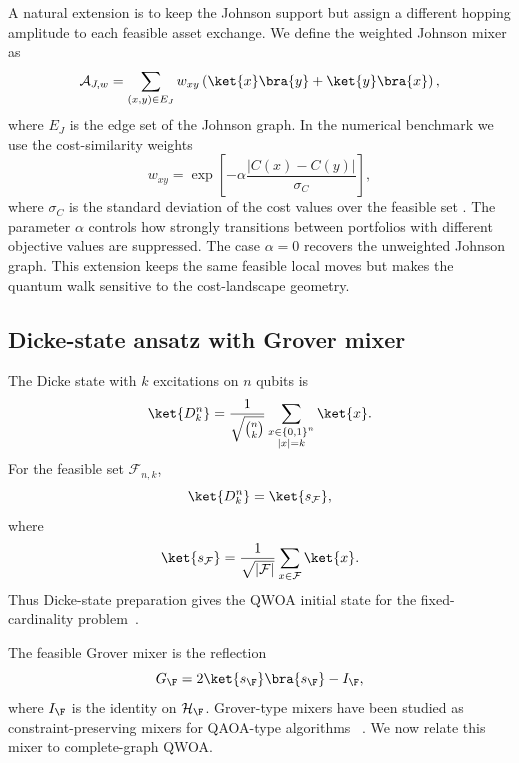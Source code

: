 A natural extension is to keep the Johnson support but assign a different
hopping amplitude to each feasible asset exchange. We define the weighted
Johnson mixer as
\begin{equation}
    \mathcal{A}_{J,w}
    =
    \sum_{(x,y)\in E_J}
    w_{xy}
    \left(
    \ket{x}\bra{y}+\ket{y}\bra{x}
    \right),
    \label{eq:weighted-johnson}
\end{equation}
where $E_J$ is the edge set of the Johnson graph. In the numerical benchmark we
use the cost-similarity weights
\begin{equation}
    w_{xy}
    =
    \exp\left[-\alpha\frac{|C(x)-C(y)|}{\sigma_C}\right],
    \label{eq:cost-weighted-johnson}
\end{equation}
where $\sigma_C$ is the standard deviation of the cost values over the feasible
set . The parameter $\alpha$ controls how strongly transitions between
portfolios with different objective values are suppressed. The case
$\alpha=0$ recovers the unweighted Johnson graph. This extension keeps the
same feasible local moves but makes the quantum walk sensitive to the
cost-landscape geometry.

\subsection{\label{subsec:dicke-grover}Dicke-state ansatz with Grover mixer}

The Dicke state with \(k\) excitations on \(n\) qubits is
\begin{equation}
    \ket{D_k^n}
    =
    \frac{1}{\sqrt{\binom{n}{k}}}
    \sum_{\substack{x\in\{0,1\}^{n}\\ |x|=k}}
    \ket{x}.
    \label{eq:dicke-state}
\end{equation}
For the feasible set \(\mathcal{F}_{n,k}\),
\begin{equation}
    \ket{D_k^n}=\ket{s_{\mathcal{F}}},
\end{equation}
where
\begin{equation}
    \ket{s_{\mathcal{F}}}
    =
    \frac{1}{\sqrt{|\mathcal{F}|}}
    \sum_{x\in\mathcal{F}}\ket{x}.
\end{equation}
Thus Dicke-state preparation gives the QWOA initial state for the
fixed-cardinality problem~\cite{Bartschi2019}.

The feasible Grover mixer is the reflection
\begin{equation}
    G_{\F}
    =
    2\ket{s_{\F}}\bra{s_{\F}}-I_{\F},
    \label{eq:grover-reflection}
\end{equation}
where $I_{\F}$ is the identity on $\mathcal{H}_{\F}$. Grover-type mixers have
been studied as constraint-preserving mixers for QAOA-type algorithms
~\cite{Bartschi2020,Bridi2024}. We now relate this mixer to complete-graph
QWOA.


